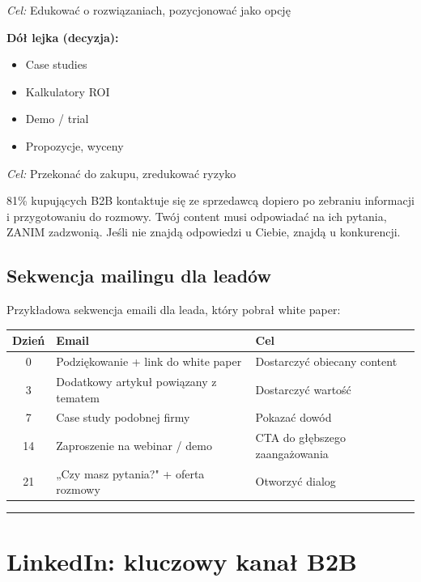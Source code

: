 \documentclass[
  12pt,
  a4paper,
  twoside,
  openright,
  12pt,
  DIV=12,
  BCOR=12mm]{scrbook}
\providecommand{\tightlist}{%
  \setlength{\itemsep}{0pt}\setlength{\parskip}{0pt}}\usepackage{longtable,booktabs,array}
\newcommand{\decoline}{%
  \begin{center}
    \textcolor{bordergray}{\rule{0.3\textwidth}{0.5pt}}
  \end{center}
}
\begin{document}
\emph{Cel:} Edukować o rozwiązaniach, pozycjonować jako opcję

\textbf{Dół lejka (decyzja):}

\begin{itemize}
\tightlist
\item
  Case studies
\item
  Kalkulatory ROI
\item
  Demo / trial
\item
  Propozycje, wyceny
\end{itemize}

\emph{Cel:} Przekonać do zakupu, zredukować ryzyko

\begin{wazne}
81\% kupujących B2B kontaktuje się ze sprzedawcą dopiero po zebraniu informacji i przygotowaniu do rozmowy. Twój content musi odpowiadać na ich pytania, ZANIM zadzwonią. Jeśli nie znajdą odpowiedzi u Ciebie, znajdą u konkurencji.
\end{wazne}

\subsection{Sekwencja mailingu dla
leadów}\label{sekwencja-mailingu-dla-leaduxf3w}

Przykładowa sekwencja emaili dla leada, który pobrał white paper:

{\small
\begin{tabularx}{\textwidth}{c X X}
\toprule
\textbf{Dzień} & \textbf{Email} & \textbf{Cel} \\
\midrule
0 & Podziękowanie + link do white paper & Dostarczyć obiecany content \\
3 & Dodatkowy artykuł powiązany z tematem & Dostarczyć wartość \\
7 & Case study podobnej firmy & Pokazać dowód \\
14 & Zaproszenie na webinar / demo & CTA do głębszego zaangażowania \\
21 & „Czy masz pytania?" + oferta rozmowy & Otworzyć dialog \\
\bottomrule
\end{tabularx}
}

\decoline

\section{LinkedIn: kluczowy kanał
B2B}\label{linkedin-kluczowy-kanaux142-b2b}
\end{document}
